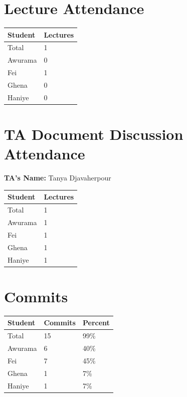 \documentclass{article}
\begin{document}
\section{Lecture Attendance}

\begin{table}[H]
\centering
\begin{tabular}{ll}
\toprule
\textbf{Student} & \textbf{Lectures}\\
\midrule
Total & 1\\
Awurama & 0\\
Fei & 1\\
Ghena & 0\\
Haniye & 0\\

\bottomrule
\end{tabular}
\end{table}

\section{TA Document Discussion Attendance}

\noindent \textbf{TA's Name: } Tanya Djavaherpour

\begin{table}[H]
\centering
\begin{tabular}{ll}
\toprule
\textbf{Student} & \textbf{Lectures}\\
\midrule
Total & 1\\
Awurama & 1\\
Fei & 1\\
Ghena & 1\\
Haniye & 1\\

\bottomrule
\end{tabular}
\end{table}

\section{Commits}

\begin{table}[H]
\centering
\begin{tabular}{lll}
\toprule
\textbf{Student} & \textbf{Commits} & \textbf{Percent}\\
\midrule
Total & 15 & 99\% \\
Awurama & 6 & 40\% \\
Fei & 7 & 45\% \\
Ghena & 1 & 7\% \\
Haniye & 1 & 7\% \\
\bottomrule
\end{tabular}
\end{table}
\end{document}
